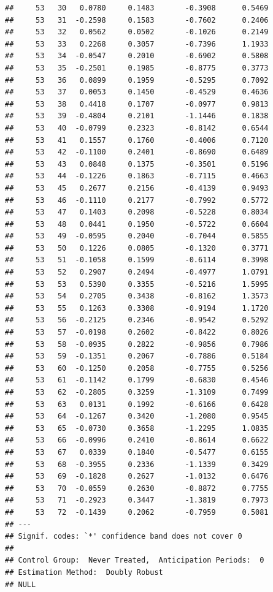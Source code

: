\documentclass[
]{article}
\begin{document}
\begin{verbatim}
##     53   30   0.0780     0.1483       -0.3908      0.5469  
##     53   31  -0.2598     0.1583       -0.7602      0.2406  
##     53   32   0.0562     0.0502       -0.1026      0.2149  
##     53   33   0.2268     0.3057       -0.7396      1.1933  
##     53   34  -0.0547     0.2010       -0.6902      0.5808  
##     53   35  -0.2501     0.1985       -0.8775      0.3773  
##     53   36   0.0899     0.1959       -0.5295      0.7092  
##     53   37   0.0053     0.1450       -0.4529      0.4636  
##     53   38   0.4418     0.1707       -0.0977      0.9813  
##     53   39  -0.4804     0.2101       -1.1446      0.1838  
##     53   40  -0.0799     0.2323       -0.8142      0.6544  
##     53   41   0.1557     0.1760       -0.4006      0.7120  
##     53   42  -0.1100     0.2401       -0.8690      0.6489  
##     53   43   0.0848     0.1375       -0.3501      0.5196  
##     53   44  -0.1226     0.1863       -0.7115      0.4663  
##     53   45   0.2677     0.2156       -0.4139      0.9493  
##     53   46  -0.1110     0.2177       -0.7992      0.5772  
##     53   47   0.1403     0.2098       -0.5228      0.8034  
##     53   48   0.0441     0.1950       -0.5722      0.6604  
##     53   49  -0.0595     0.2040       -0.7044      0.5855  
##     53   50   0.1226     0.0805       -0.1320      0.3771  
##     53   51  -0.1058     0.1599       -0.6114      0.3998  
##     53   52   0.2907     0.2494       -0.4977      1.0791  
##     53   53   0.5390     0.3355       -0.5216      1.5995  
##     53   54   0.2705     0.3438       -0.8162      1.3573  
##     53   55   0.1263     0.3308       -0.9194      1.1720  
##     53   56  -0.2125     0.2346       -0.9542      0.5292  
##     53   57  -0.0198     0.2602       -0.8422      0.8026  
##     53   58  -0.0935     0.2822       -0.9856      0.7986  
##     53   59  -0.1351     0.2067       -0.7886      0.5184  
##     53   60  -0.1250     0.2058       -0.7755      0.5256  
##     53   61  -0.1142     0.1799       -0.6830      0.4546  
##     53   62  -0.2805     0.3259       -1.3109      0.7499  
##     53   63   0.0131     0.1992       -0.6166      0.6428  
##     53   64  -0.1267     0.3420       -1.2080      0.9545  
##     53   65  -0.0730     0.3658       -1.2295      1.0835  
##     53   66  -0.0996     0.2410       -0.8614      0.6622  
##     53   67   0.0339     0.1840       -0.5477      0.6155  
##     53   68  -0.3955     0.2336       -1.1339      0.3429  
##     53   69  -0.1828     0.2627       -1.0132      0.6476  
##     53   70  -0.0559     0.2630       -0.8872      0.7755  
##     53   71  -0.2923     0.3447       -1.3819      0.7973  
##     53   72  -0.1439     0.2062       -0.7959      0.5081  
## ---
## Signif. codes: `*' confidence band does not cover 0
## 
## Control Group:  Never Treated,  Anticipation Periods:  0
## Estimation Method:  Doubly Robust
## NULL
\end{verbatim}
\end{document}
